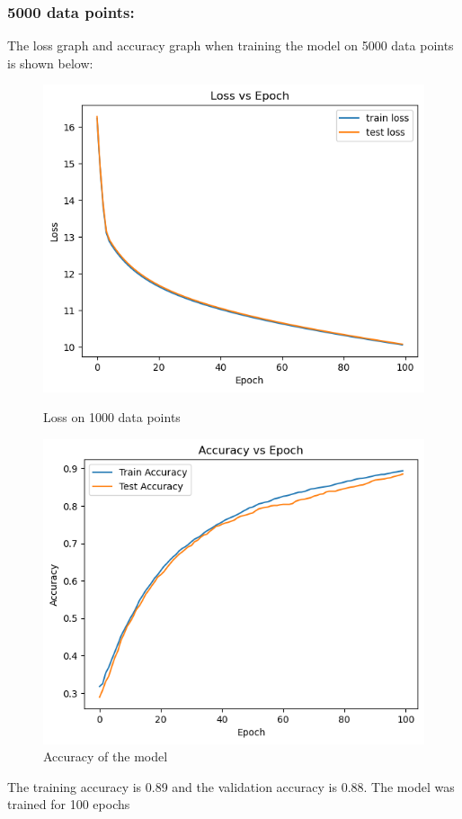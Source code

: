 \documentclass{article}
\begin{document}
\subsubsection*{5000 data points:}
The loss graph and accuracy graph when training the model on 5000 data points is shown below:
\begin{figure}[h!]
    \centering
    \begin{minipage}{0.45\textwidth}
        \centering
        \includegraphics[width=1\textwidth]{loss_5000.png} %
        \caption{Loss on 1000 data points}
    \end{minipage}\hfill
    \begin{minipage}{0.45\textwidth}
        \centering
        \includegraphics[width=1\textwidth]{accuracy_5000.png} %
        \caption{Accuracy of the model}
    \end{minipage}
\end{figure}
\newline The training accuracy is 0.89 and the validation accuracy is 0.88. The model was trained for 100 epochs\newline
\end{document}
